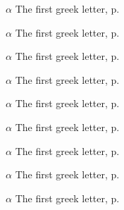 \begin{eqlist}
    \item[$\alpha$]
    The first greek letter, p.~\pageref{ChX-figure: FigureLabel7}

    \item[$\alpha$]
    The first greek letter, p.~\pageref{ChX-figure: FigureLabel8}

    \item[$\alpha$]
    The first greek letter, p.~\pageref{ChX-figure: FigureLabel3}

    \item[$\alpha$]
    The first greek letter, p.~\pageref{ChX-figure: FigureLabel3}

    \item[$\alpha$]
    The first greek letter, p.~\pageref{ChX-figure: FigureLabel3}

    \item[$\alpha$]
    The first greek letter, p.~\pageref{ChX-figure: FigureLabel3}

    \item[$\alpha$]
    The first greek letter, p.~\pageref{ChX-figure: FigureLabel3}

    \item[$\alpha$]
    The first greek letter, p.~\pageref{ChX-figure: FigureLabel3}

    \item[$\alpha$]
    The first greek letter, p.~\pageref{ChX-figure: FigureLabel3}

\end{eqlist}